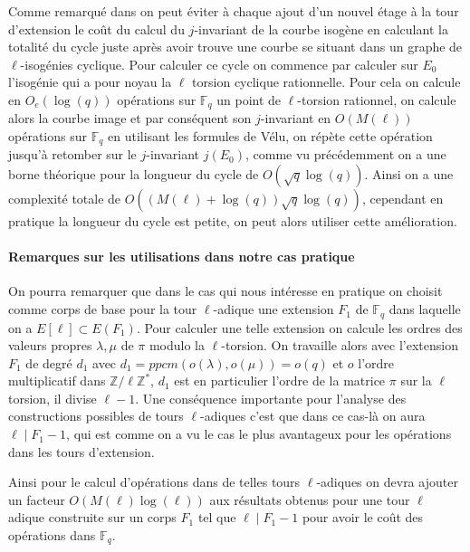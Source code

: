 \documentclass[10pt,a4paper]{book}
\theoremstyle{plain}
\theoremstyle{definition}
\theoremstyle{definition}
\theoremstyle{definition}
\theoremstyle{definition}
\theoremstyle{remark}
\theoremstyle{remark}
\begin{document}
Comme remarqué dans \cite{DeFeo-Doliskani-Schost13} on peut éviter à chaque ajout d'un nouvel étage à la tour d'extension le coût du calcul du $j$-invariant de la courbe isogène en calculant la totalité du cycle juste après avoir trouve une courbe se situant dans un graphe de $\ell$-isogénies cyclique. Pour calculer ce cycle on commence par calculer sur $E_0$ l'isogénie qui a pour noyau la $\ell$ torsion cyclique rationnelle. Pour cela on calcule en $O_e(\log(q))$ opérations sur $\mathbb{F}_q$ un point de $\ell$-torsion rationnel, on calcule alors la courbe image et par conséquent son $j$-invariant en $O(M(\ell))$ opérations sur $\mathbb{F}_q$ en utilisant les formules de Vélu, on répète cette opération jusqu'à retomber sur le $j$-invariant $j(E_0)$, comme vu précédemment on a une borne théorique pour la longueur du cycle de $O(\sqrt{q}\log(q))$. Ainsi on a une complexité totale de $O((M(\ell) + \log(q)) \sqrt{q} \log(q))$, cependant en pratique la longueur du cycle est petite, on peut alors utiliser cette amélioration.


\paragraph{Remarques sur les utilisations dans notre cas pratique}
On pourra remarquer que dans le cas qui nous intéresse en pratique on choisit comme corps de base pour la tour $\ell$-adique une extension $F_1$ de $\mathbb{F}_q$ dans laquelle on a $E[\ell] \subset E(F_1)$. Pour calculer une telle extension on calcule les ordres des valeurs propres $\lambda, \mu$ de $\pi$ modulo la $\ell$-torsion. On travaille alors avec l'extension $F_1$ de degré $d_1$ avec $d_1=ppcm(o(\lambda),o(\mu))=o(q)$ et $o$ l'ordre multiplicatif dans $\mathbb{Z}/\ell\mathbb{Z}^*$, $d_1$ est en particulier l'ordre de la matrice $\pi$ sur la $\ell$ torsion, il divise $\ell-1$. Une conséquence importante pour l'analyse des constructions possibles de tours $\ell$-adiques c'est que dans ce cas-là on aura $\ell \mid F_1-1$, qui est comme on a vu le cas le plus avantageux pour les opérations dans les tours d'extension. 

Ainsi pour le calcul d'opérations dans de telles tours $\ell$-adiques on devra ajouter un facteur $O(M(\ell)\log(\ell))$ aux résultats obtenus pour une tour $\ell$ adique construite sur un corps $F_1$ tel que $\ell \mid F_1-1$ pour avoir le coût des opérations dans $\mathbb{F}_q$.
\end{document}
